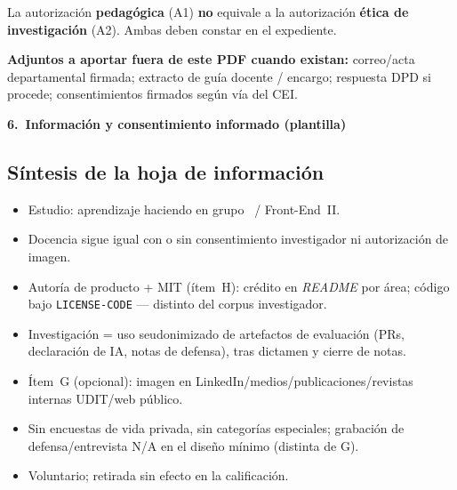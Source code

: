 \documentclass[11pt,a4paper]{scrartcl}
\newcommand{\AnnexTitle}[1]{%
  \clearpage
  \LogoRow
  \begin{center}{\Large\sffamily\bfseries #1}\end{center}
  \vspace{0.4em}
  \noindent{\color{rulegray}\hrule height 0.4pt}
  \vspace{0.5em}
}
\begin{document}
\vspace{0.5em}
\noindent
La autorización \textbf{pedagógica} (A1) \textbf{no} equivale a la autorización
\textbf{ética de investigación} (A2). Ambas deben constar en el expediente.

\noindent\textbf{Adjuntos a aportar fuera de este PDF cuando existan:}
correo/acta departamental firmada; extracto de guía docente / encargo;
respuesta DPD si procede; consentimientos firmados según vía del CEI.

\AnnexTitle{6.\ Información y consentimiento informado (plantilla)}


\subsection*{Síntesis de la hoja de información}
\begin{itemize}
  \item Estudio: aprendizaje haciendo en grupo \TTODfull\ / Front-End~II.
  \item Docencia sigue igual con o sin consentimiento investigador ni autorización de imagen.
  \item Autoría de producto + MIT (ítem~H): crédito en \emph{README} por área; código bajo
        \texttt{LICENSE-CODE} --- distinto del corpus investigador.
  \item Investigación = uso seudonimizado de artefactos de evaluación (PRs,
        declaración de IA, notas de defensa), tras dictamen y cierre de notas.
  \item Ítem~G (opcional): imagen en LinkedIn/medios/publicaciones/revistas internas UDIT/web público.
  \item Sin encuestas de vida privada, sin categorías especiales; grabación de
        defensa/entrevista N/A en el diseño mínimo (distinta de G).
  \item Voluntario; retirada sin efecto en la calificación.
\end{itemize}

\vspace{0.3em}
\AuthoritiesBlock
\end{document}
